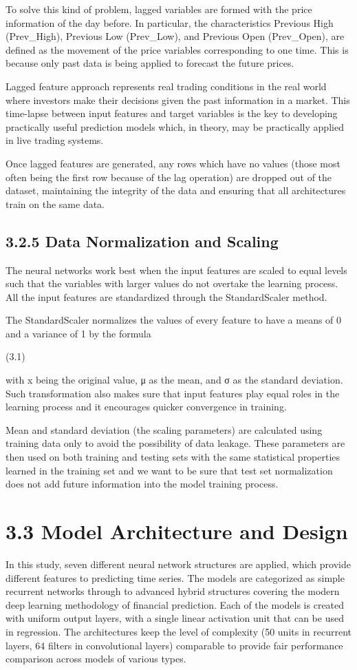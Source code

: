 \documentclass[12pt,a4paper]{report}
\begin{document}
To solve this kind of problem, lagged variables are formed with the price information of the day before. In particular, the characteristics Previous High (Prev\_High), Previous Low (Prev\_Low), and Previous Open (Prev\_Open), are defined as the movement of the price variables corresponding to one time. This is because only past data is being applied to forecast the future prices.

Lagged feature approach represents real trading conditions in the real world where investors make their decisions given the past information in a market. This time-lapse between input features and target variables is the key to developing practically useful prediction models which, in theory, may be practically applied in live trading systems.

Once lagged features are generated, any rows which have no values (those most often being the first row because of the lag operation) are dropped out of the dataset, maintaining the integrity of the data and ensuring that all architectures train on the same data.

\subsection{3.2.5 Data Normalization and Scaling}
The neural networks work best when the input features are scaled to equal levels such that the variables with larger values do not overtake the learning process. All the input features are standardized through the StandardScaler method.

The StandardScaler normalizes the values of every feature to have a means of 0 and a variance of 1 by the formula

							(3.1)

with x being the original value, μ as the mean, and σ as the standard deviation. Such transformation also makes sure that input features play equal roles in the learning process and it encourages quicker convergence in training.

Mean and standard deviation (the scaling parameters) are calculated using training data only to avoid the possibility of data leakage. These parameters are then used on both training and testing sets with the same statistical properties learned in the training set and we want to be sure that test set normalization does not add future information into the model training process.

\section{3.3 Model Architecture and Design}
In this study, seven different neural network structures are applied, which provide different features to predicting time series. The models are categorized as simple recurrent networks through to advanced hybrid structures covering the modern deep learning methodology of financial prediction. Each of the models is created with uniform output layers, with a single linear activation unit that can be used in regression. The architectures keep the level of complexity (50 units in recurrent layers, 64 filters in convolutional layers) comparable to provide fair performance comparison across models of various types.
\end{document}
